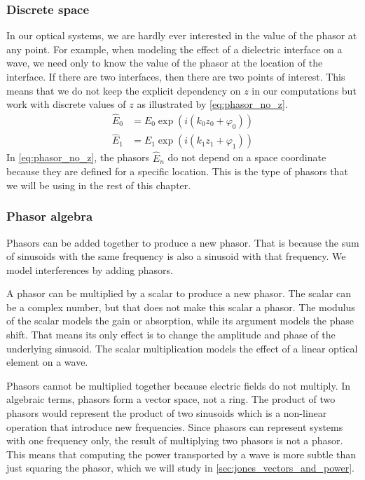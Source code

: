 \subsubsection{Discrete space}
In our optical systems, we are hardly ever interested in the value of the phasor at any point.
For example, when modeling the effect of a dielectric interface on a wave, we need only to know the value of the phasor at the location of the interface.
If there are two interfaces, then there are two points of interest.
This means that we do not keep the explicit dependency on $z$ in our computations but work with discrete values of $z$ as illustrated by \cref{eq:phasor_no_z}.
\begin{equation}
    \begin{aligned}
        \hat{E}_0 &= E_0 \exp(i(k_0 z_0 + \varphi_0))
        \\
        \hat{E}_1 &= E_1 \exp(i(k_1 z_1 + \varphi_1))
    \end{aligned}
    \label{eq:phasor_no_z}
\end{equation}
In \cref{eq:phasor_no_z}, the phasors $\hat{E}_n$ do not depend on a space coordinate because they are defined for a specific location.
This is the type of phasors that we will be using in the rest of this chapter.




\subsubsection{Phasor algebra}
Phasors can be added together to produce a new phasor.
That is because the sum of sinusoids with the same frequency is also a sinusoid with that frequency.
We model interferences by adding phasors.

A phasor can be multiplied by a scalar to produce a new phasor.
The scalar can be a complex number, but that does not make this scalar a phasor. 
The modulus of the scalar models the gain or absorption, while its argument models the phase shift.
That means its only effect is to change the amplitude and phase of the underlying sinusoid.
The scalar multiplication models the effect of a linear optical element on a wave.

Phasors cannot be multiplied together because electric fields do not multiply.
In algebraic terms, phasors form a vector space, not a ring.
The product of two phasors would represent the product of two sinusoids which is a non-linear operation that introduce new frequencies.
Since phasors can represent systems with one frequency only, the result of multiplying two phasors is not a phasor.
This means that computing the power transported by a wave is more subtle than just squaring the phasor, which we will study in \vref{sec:jones_vectors_and_power}.





